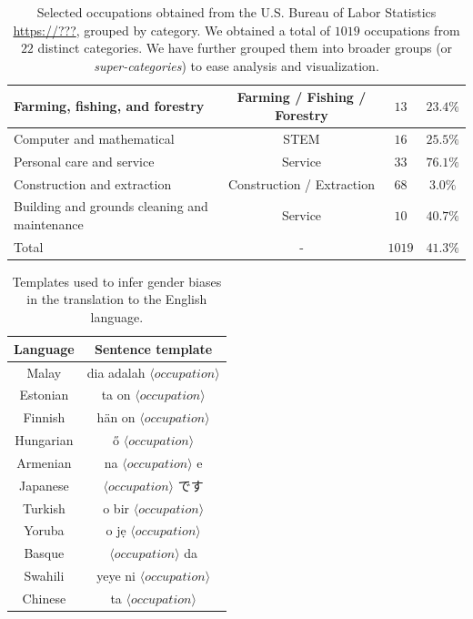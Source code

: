 \documentclass[fleqn,10pt]{article}
\begin{document}
\begin{table}[H]
\begin{small}
\begin{tabular}{|m{3.5cm}|c|c|c|}
	Farming, fishing, and forestry 					& Farming / Fishing / Forestry 	& $13$ 				& $23.4\%$				\\ \hline
	Computer and mathematical						& STEM 							& $16$ 				& $25.5\%$				\\ \hline
	Personal care and service						& Service 						& $33$ 				& $76.1\%$				\\ \hline
	Construction and extraction 					& Construction / Extraction 	& $68$ 				& $3.0\%$ 				\\ \hline
	Building and grounds cleaning and maintenance 	& Service 						& $10$ 				& $40.7\%$				\\ \hline \hline
	Total											& - 							& $1019$			& $41.3\%$				\\ \hline
	\end{tabular}
	\caption{Selected occupations obtained from the U.S. Bureau of Labor Statistics \url{https://???}, grouped by category. We obtained a total of $1019$ occupations from $22$ distinct categories. We have further grouped them into broader groups (or \emph{super-categories}) to ease analysis and visualization.}
	\label{tab:occupations}
	\end{small}
\end{table}

\begin{table}[H]
\small{
	\centering
	\begin{tabular}{|c|c|}
	\hline
	Language 	& Sentence template 						\\ \hline \hline
	Malay		& dia adalah $\langle occupation \rangle$ 	\\ \hline
	Estonian	& ta on $\langle occupation \rangle$ 		\\ \hline
	Finnish		& hän on $\langle occupation \rangle$ 		\\ \hline
	Hungarian	& ő $\langle occupation \rangle$ 			\\ \hline
	Armenian	& na $\langle occupation \rangle$ e 		\\ \hline
	Japanese	& $\langle occupation \rangle$ です			\\ \hline
	Turkish		& o bir $\langle occupation \rangle$ 		\\ \hline
	Yoruba		& o jẹ $\langle occupation \rangle$ 		\\ \hline
	Basque		& $\langle occupation \rangle$ da 			\\ \hline
	Swahili		& yeye ni $\langle occupation \rangle$ 		\\ \hline
	Chinese		& ta $\langle occupation \rangle$ 			\\ \hline
	\end{tabular}
	\caption{Templates used to infer gender biases in the translation to the English language.}
	\label{tab:templates}
	}
\end{table}
\end{document}
